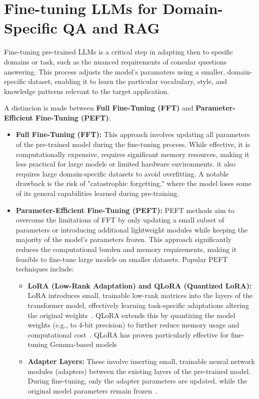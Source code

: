 \documentclass[12pt]{report}
\begin{document}
\section{Fine-tuning LLMs for Domain-Specific QA and RAG}

Fine-tuning pre-trained LLMs is a critical step in adapting then to spesific domains or task, such as the nuanced requirements of consular questions answering. This process adjusts the model's paramaters using a smaller, domain-specific dataset, enabling it to learn the particular vocabulary, style, and knowledge patterns relevant to the target application.

A distincion is made between \textbf{Full Fine-Tuning (FFT)} and \textbf{Parameter-Efficient Fine-Tuning (PEFT)}:

\begin{itemize}
    \item \textbf{Full Fine-Tuning (FFT):} This approach involves updating all parameters of the pre-trained model during the fine-tuning process. While effective, it is computationally expensive, requires significant memory resources, making it less practical for large models or limited hardware environments. it also requires large domain-specific datasets to avoid overfitting. A notable drawback is the risk of "catastrophic forgetting," where the model loses some of its general capabilities learned during pre-training.
    \item \textbf{Parameter-Efficient Fine-Tuning (PEFT):} PEFT methods aim to overcome the limitations of FFT by only updating a small subset of parameters or introducing additional lightweight modules while keeping the majority of the model's parameters frozen. This approach significantly reduces the computational burden and memory requirements, making it feasible to fine-tune large models on smaller datasets. Popular PEFT techniques include:
    \begin{itemize}
      \item \textbf{LoRA (Low-Rank Adaptation) and QLoRA (Quantized LoRA):} LoRA introduces small, trainable low-rank matrices into the layers of the transformer model, effectively learning task-specific adaptations altering the original weights~\cite{hu2021loralowrankadaptationlarge}. QLoRA extends this by quantizing the model weights (e.g., to 4-bit precision) to further reduce memory usage and computational cost~\cite{dettmers2023qloraefficientfinetuningquantized}. QLoRA has proven particularly effective for fine-tuning Gemma-based models~\cite{gemma_qlora_2025}
      \item \textbf{Adapter Layers:} These involve inserting small, trainable neural network modules (adapters) between the existing layers of the pre-trained model. During fine-tuning, only the adapter parameters are updated, while the original model parameters remain frozen~\cite{hu2023llmadaptersadapterfamilyparameterefficient}.

\end{itemize}
\end{itemize}
\end{document}

